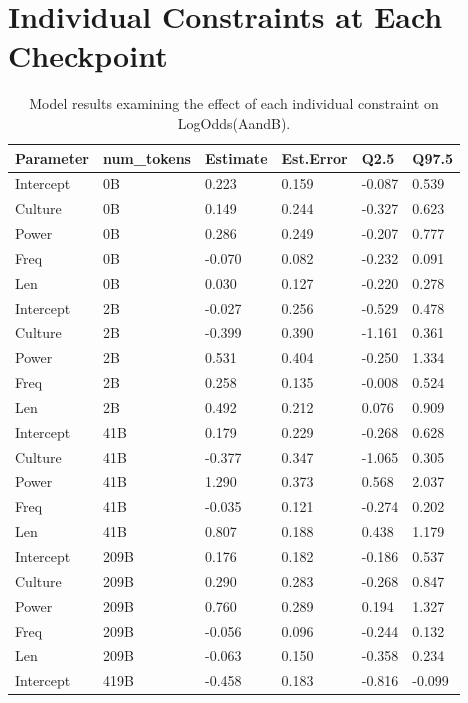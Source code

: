 \documentclass[
  12pt,
  letterpaper,
]{scrreprt}
\begin{document}
\chapter{Individual Constraints at Each
Checkpoint}\label{sec-individual-constraints-at-each-checkpoint}

\begin{longtable}[]{@{}llllll@{}}

\caption{\label{tbl-exp2m2}Model results examining the effect of each
individual constraint on LogOdds(AandB).}

\tabularnewline

\toprule\noalign{}
Parameter & num\_tokens & Estimate & Est.Error & Q2.5 & Q97.5 \\
\midrule\noalign{}
\endhead
\bottomrule\noalign{}
\endlastfoot
Intercept & 0B & 0.223 & 0.159 & -0.087 & 0.539 \\
Culture & 0B & 0.149 & 0.244 & -0.327 & 0.623 \\
Power & 0B & 0.286 & 0.249 & -0.207 & 0.777 \\
Freq & 0B & -0.070 & 0.082 & -0.232 & 0.091 \\
Len & 0B & 0.030 & 0.127 & -0.220 & 0.278 \\
Intercept & 2B & -0.027 & 0.256 & -0.529 & 0.478 \\
Culture & 2B & -0.399 & 0.390 & -1.161 & 0.361 \\
Power & 2B & 0.531 & 0.404 & -0.250 & 1.334 \\
Freq & 2B & 0.258 & 0.135 & -0.008 & 0.524 \\
Len & 2B & 0.492 & 0.212 & 0.076 & 0.909 \\
Intercept & 41B & 0.179 & 0.229 & -0.268 & 0.628 \\
Culture & 41B & -0.377 & 0.347 & -1.065 & 0.305 \\
Power & 41B & 1.290 & 0.373 & 0.568 & 2.037 \\
Freq & 41B & -0.035 & 0.121 & -0.274 & 0.202 \\
Len & 41B & 0.807 & 0.188 & 0.438 & 1.179 \\
Intercept & 209B & 0.176 & 0.182 & -0.186 & 0.537 \\
Culture & 209B & 0.290 & 0.283 & -0.268 & 0.847 \\
Power & 209B & 0.760 & 0.289 & 0.194 & 1.327 \\
Freq & 209B & -0.056 & 0.096 & -0.244 & 0.132 \\
Len & 209B & -0.063 & 0.150 & -0.358 & 0.234 \\
Intercept & 419B & -0.458 & 0.183 & -0.816 & -0.099 \\

\end{longtable}
\end{document}
